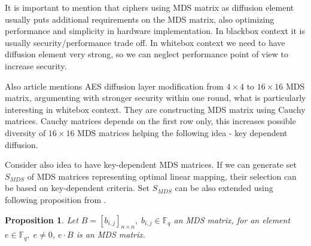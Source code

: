 \documentclass[11pt,oneside,final]{fithesis2}
\newtheorem{myprop}{Proposition}
\begin{document}
    It is important to mention that ciphers using MDS matrix as diffusion element usually puts additional requirements on the MDS matrix, also optimizing
    performance and simplicity in hardware implementation. In blackbox context it is usually security/performance trade off. In whitebox context we need
    to have diffusion element very strong, so we can neglect performance point of view to increase security.
    
    Also article \cite{mds_aes} mentions AES diffusion layer modification from $4 \times 4$ to $16 \times 16$ MDS matrix, argumenting with 
    stronger security within one round, what is particularly interesting in whitebox context. They are constructing MDS matrix using Cauchy matrices. Cauchy matrices
    depends on the first row only, this increases possible diversity of $16 \times 16$ MDS matrices helping the following idea - key dependent diffusion.

    \begin{figure}
    \begin{center}
    \leavevmode
    \centerline{}
    \end{center}
    \caption{}
    \label{fig:aes_mds}
    \end{figure}
    
    Consider also idea to have key-dependent MDS matrices. If we can generate set $S_{MDS}$ of MDS matrices representing optimal linear mapping, their selection 
    can be based on key-dependent criteria. Set $S_{MDS}$ can be also extended using following proposition from \citep{journals/iacr/MalikN11}.

    \begin{myprop}
	Let $B = \left[b_{i,j} \right]_{n \times n},\; b_{i,j} \in \mathbb{F}_q$ an MDS matrix, for an element $e \in \mathbb{F}_q, \; e \neq 0$, $e \cdot B$ is an MDS matrix.
    \end{myprop}
    
\end{document}
